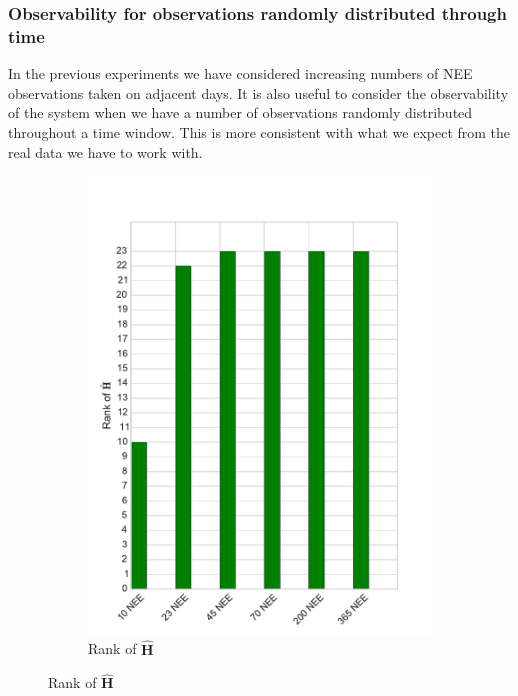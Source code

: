 \documentclass[11pt]{article}
\begin{document}
\subsubsection{Observability for observations randomly distributed through time}

In the previous experiments we have considered increasing numbers of NEE observations taken on adjacent days. It is also useful to consider the observability of the system when we have a number of observations randomly distributed throughout a time window. This is more consistent with what we expect from the real data we have to work with.  

\begin{figure}[ht]
    \centering
    \begin{subfigure}[b]{0.4\textwidth}
        \includegraphics[width=\textwidth]{dalec2_obsrankwind.pdf}
        \caption{Rank of $\hat{\textbf{H}}$}
        \label{fig:D2_observailityrankwind}
    \end{subfigure}

\end{figure}
\end{document}
